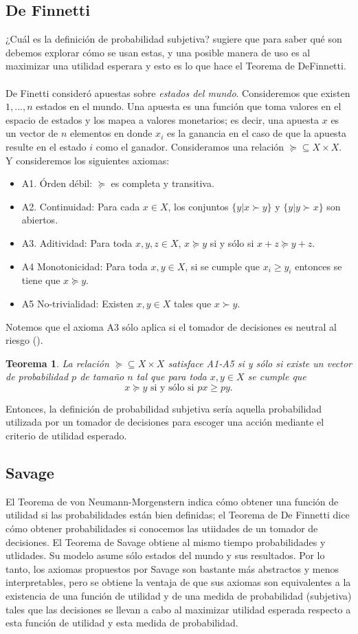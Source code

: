\documentclass[11pt]{article}
\theoremstyle{plain}
\newtheorem{teo}{Teorema}
\begin{document}
\subsection{De Finnetti}
¿Cuál es la definición de probabilidad subjetiva? \cite{gilboa2009decision} sugiere que para saber qué son debemos explorar cómo se usan estas, y una posible manera de uso es al maximizar una utilidad esperara y esto es lo que hace el Teorema de DeFinnetti.\\
\\
De Finetti consideró apuestas sobre \textit{estados del mundo}. Consideremos que existen $1,...,n$ estados en el mundo. Una apuesta es una función que toma valores en el espacio de estados y los mapea a valores monetarios; es decir, una apuesta $x$ es un vector de $n$ elementos en donde $x_i$ es la ganancia en el caso de que la apuesta resulte en el estado $i$ como el ganador. Consideramos una relación $\succeq \subseteq X \times X$. Y consideremos los siguientes axiomas:
\begin{itemize}
\item A1. Órden débil: $\succeq$ es completa y transitiva.
\item A2. Continuidad: Para cada $x \in X$, los conjuntos $\{ y | x \succ y \}$ y $\{ y | y \succ x \}$ son abiertos.
\item A3. Aditividad: Para toda $x,y,z \in X$, $x \succeq y$ si y sólo si $x+z \succeq y+z$.
\item A4 Monotonicidad: Para toda $x,y \in X$, si se cumple que $x_i \geq y_i$ entonces se tiene que $x \succeq y$.
\item A5 No-trivialidad: Existen $x,y \in X$ tales que $x \succ y$.
\end{itemize}
Notemos que el axioma A3 sólo aplica si el tomador de decisiones es neutral al riesgo (\cite{gilboa2009decision}).
\begin{teo}
La relación $\succeq \subseteq X \times X$ satisface A1-A5 si y sólo si existe un vector de probabilidad $p$ de tamaño $n$ tal que para toda $x,y \in X$ se cumple que
\[ x \succeq y \textrm { si y sólo si } px \geq py. \]
\end{teo}
Entonces, la definición de probabilidad subjetiva sería aquella probabilidad utilizada por un tomador de decisiones para escoger una acción mediante el criterio de utilidad esperado.
\subsection{Savage}
El Teorema de von Neumann-Morgenstern indica cómo obtener una función de utilidad si las probabilidades están bien definidas; el Teorema de De Finnetti dice cómo obtener probabilidades si conocemos las utiidades de un tomador de decisiones. El Teorema de Savage obtiene al mismo tiempo probabilidades y utlidades. Su modelo asume sólo estados del mundo y sus resultados. Por lo tanto, los axiomas propuestos por Savage son bastante más abstractos y menos interpretables, pero se obtiene la ventaja de que sus axiomas son equivalentes a la existencia de una función de utilidad y de una medida de probabilidad (subjetiva) tales que las decisiones se llevan a cabo al maximizar utilidad esperada respecto a esta función de utilidad y esta medida de probabilidad.
\end{document}
